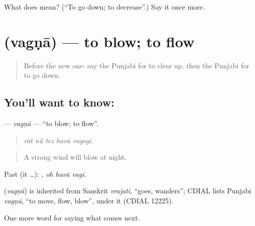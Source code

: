 \begin{tcolorbox}[breakable,colback=teal!4,colframe=teal!35!black,title={Before you move on}]
What does  mean? (\textquotedblleft{}To go down; to decrease\textquotedblright{}.) Say it once more.
\end{tcolorbox}
\section[\texorpdfstring{\pa{ਵਗਣਾ} (vagṇā)}{ਵਗਣਾ (vagṇā)}]{ (vagṇā) — to blow; to flow}

\label{lesson:PA-C290-vagna}



\begin{quote}
Before the new one: say the Punjabi for to clear up, then the Punjabi for to go down.
\end{quote}

\subsection*{You'll want to know: }
\textbf{} — \emph{vagṇā} — \textquotedblleft{}to blow; to flow\textquotedblright{}.

\begin{quote}
    
\end{quote}

\begin{quote}
\emph{rāt nū̃ tez havā vagegī.}
\end{quote}

\begin{quote}
A strong wind will blow at night.
\end{quote}

Past (it …):   , \emph{oh havā vagī}.

\begin{cousinweb}
\textbf{} (\emph{vagṇā}) is inherited from Sanskrit \emph{vrajati}, \textquotedblleft{}goes, wanders\textquotedblright{}; CDIAL lists Punjabi \emph{vagṇā}, \textquotedblleft{}to move, flow, blow\textquotedblright{}, under it (CDIAL 12225).
\end{cousinweb}

\begin{grammarlens}[title={What you've built}]
One more word for saying what comes next.
\end{grammarlens}

